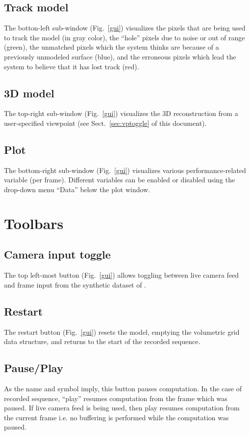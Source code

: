 \documentclass[12pt]{article}
\begin{document}
\subsection{Track model}
The botton-left sub-window (Fig.~\ref{gui}) visualizes the pixels that are being used to track the model (in gray color), the ``hole'' pixels due to noise or out of range (green), the unmatched pixels which the system thinks are because of a previously unmodeled surface (blue), and the erroneous pixels which lead the system to believe that it has lost track (red).

\subsection{3D model}
The top-right sub-window (Fig.~\ref{gui}) visualizes the 3D reconstruction from a user-specified viewpoint (see Sect.~\ref{sec:vptoggle} of this document).

\subsection{Plot}
The bottom-right sub-window (Fig.~\ref{gui}) visualizes various performance-related variable (per frame). Different variables can be enabled or disabled using the drop-down menu ``Data'' below the plot window.

\section{Toolbars}

\subsection{Camera input toggle}
\label{sec:camtogg}
The top left-most button (Fig.~\ref{gui}) allows toggling between live camera feed and frame input from the synthetic dataset of \cite{2014Handa}. 

\subsection{Restart}
The restart button (Fig.~\ref{gui}) resets the model, emptying the volumetric grid data structure, and returns to the start of the recorded sequence. 

\subsection{Pause/Play}
As the name and symbol imply, this button pauses computation. In the case of recorded sequence, ``play'' resumes computation from the frame which was paused. If live camera feed is being used, then play resumes computation from the current frame i.e. no buffering is performed while the computation was paused.
\end{document}
